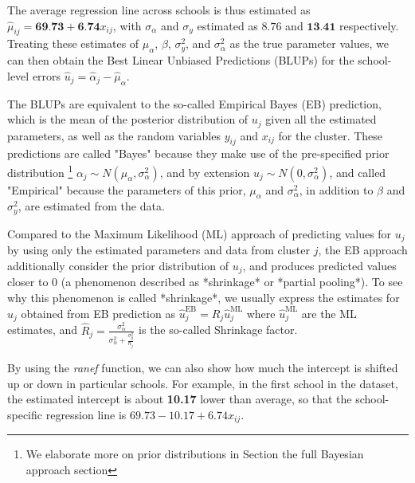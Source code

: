 The average regression line across schools is thus estimated as $\hat{\mu}_{ij} = \textbf{69.73} + \textbf{6.74} x_{ij}$, with $\sigma_\alpha$ and $\sigma_y$ estimated as $8.76$ and $\textbf{13.41}$ respectively.  Treating these estimates of $\mu_\alpha$, $\beta$, $\sigma^2_{y}$, and $\sigma^2_{\alpha}$ as the true parameter values, we can then obtain the Best Linear Unbiased Predictions (BLUPs) for the school-level errors $\hat{u}_j = \hat{\alpha}_{j} - \hat{\mu}_{\alpha}$. 

The BLUPs are equivalent to the so-called Empirical Bayes (EB) prediction, which is the mean of the posterior distribution of $u_{j}$ given all the estimated parameters, as well as the random variables $y_{ij}$ and $x_{ij}$ for the cluster.  These predictions are called "Bayes" because they make use of the pre-specified prior distribution \footnote{We elaborate more on prior distributions in Section the full Bayesian approach section} $\alpha_j \sim N(\mu_\alpha, \sigma^2_\alpha)$, and by extension $u_j \sim N(0, \sigma^2_\alpha)$, and called "Empirical" because the parameters of this prior, $\mu_\alpha$ and $\sigma^2_{\alpha}$, in addition to $\beta$ and $\sigma^2_{y}$, are estimated from the data.

Compared to the Maximum Likelihood (ML) approach of predicting values for $u_j$ by using only the estimated parameters and data from cluster $j$, the EB approach additionally consider the prior distribution of $u_{j}$, and produces predicted values closer to $0$ (a phenomenon described as *shrinkage* or *partial pooling*).  To see why this phenomenon is called *shrinkage*, we usually express the estimates for $u_j$ obtained from EB prediction as $\hat{u}_j^{\text{EB}} = \hat{R}_j\hat{u}_j^{\text{ML}}$ where $\hat{u}_j^{\text{ML}}$ are the ML estimates, and $\hat{R}_j = \frac{\sigma_\alpha^2}{\sigma_\alpha^2 + \frac{\sigma_y^2}{n_j}}$ is the so-called Shrinkage factor.

By using the \textit{ranef} function, we can also show how much the intercept is shifted up or down in particular schools. For example, in the first school in the dataset, the estimated intercept is about \textbf{10.17} lower than average, so that the school-specific regression line is $69.73 - 10.17 + 6.74 x_{ij}$.

